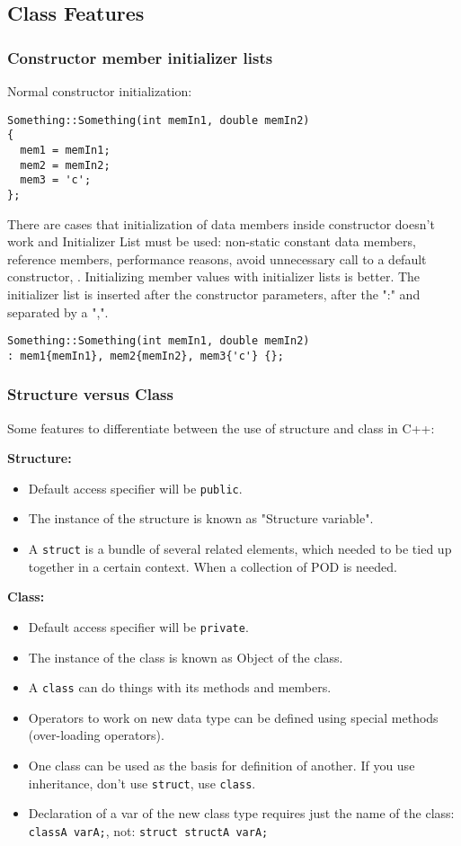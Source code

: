 \subsection{Class Features}

\subsubsection{Constructor member initializer lists}

Normal constructor initialization:
\begin{verbatim}
Something::Something(int memIn1, double memIn2)
{
  mem1 = memIn1;
  mem2 = memIn2;
  mem3 = 'c';
};
\end{verbatim}


There are cases that initialization of data members inside constructor doesn’t work and Initializer List must be used: non-static constant data members, reference members, performance reasons, avoid unnecessary call to a default constructor, \etc. Initializing member values with initializer lists is better. The initializer list is inserted after the constructor parameters, after the ":" and separated by a ",".
\begin{verbatim}
Something::Something(int memIn1, double memIn2)
: mem1{memIn1}, mem2{memIn2}, mem3{'c'} {};
\end{verbatim}

\subsubsection{Structure versus Class}

Some features to differentiate between the use of structure and class in C++:

\textbf{Structure:}
\begin{itemize}
	\setlength\itemsep{0em}
	\item Default access specifier will be \verb|public|.
	\item The instance of the structure is known as "Structure variable".
	\item A \verb|struct| is a bundle of several related elements, which needed to be tied up together in a certain context. When a collection of \ac{POD} is needed.
\end{itemize}

\textbf{Class:}
\begin{itemize}
	\setlength\itemsep{0em}
	\item Default access specifier will be \verb|private|.
	\item The instance of the class is known as Object of the class.
	\item A \verb|class| can do things with its methods and members.
	\item Operators to work on new data type can be defined using special methods (over-loading operators).
	\item One class can be used as the basis for definition of another. If you use inheritance, don't use \verb|struct|, use \verb|class|.
	\item Declaration of a var of the new class type requires just the name of the class: \verb|classA varA;|, not: \verb|struct structA varA;|
\end{itemize}

